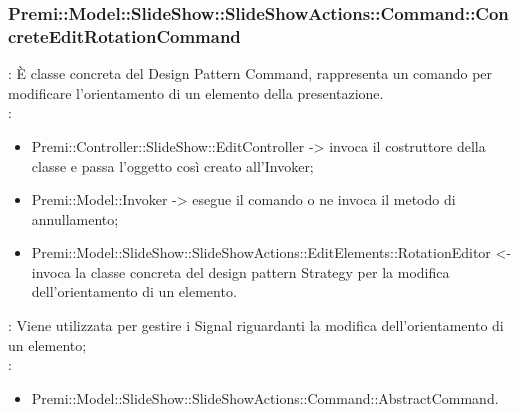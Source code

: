 {                     \subsubsection{Premi::Model::SlideShow::SlideShowActions::Command::ConcreteEditRotationCommand}{
				\textbf{\tipo}: È classe concreta del Design Pattern Command, rappresenta un comando per modificare l'orientamento di un elemento della presentazione.\\	
				\textbf{\relaz}: 
				\begin{itemize}
					\item Premi::Controller::SlideShow::EditController -> invoca il costruttore della classe e passa l’oggetto così creato all’Invoker;
                    \item Premi::Model::Invoker -> esegue il comando o ne invoca il metodo di annullamento;
                    \item Premi::Model::SlideShow::SlideShowActions::EditElements::RotationEditor <- invoca la classe concreta del design pattern Strategy per la modifica dell'orientamento di un elemento.
				\end{itemize}	
                \textbf{\interfacce}: Viene utilizzata per gestire i Signal riguardanti la modifica dell'orientamento di un elemento;\\
                \textbf{\base}: 
                    \begin{itemize}
                    \item Premi::Model::SlideShow::SlideShowActions::Command::AbstractCommand.
                    \end{itemize}
                    }
}
